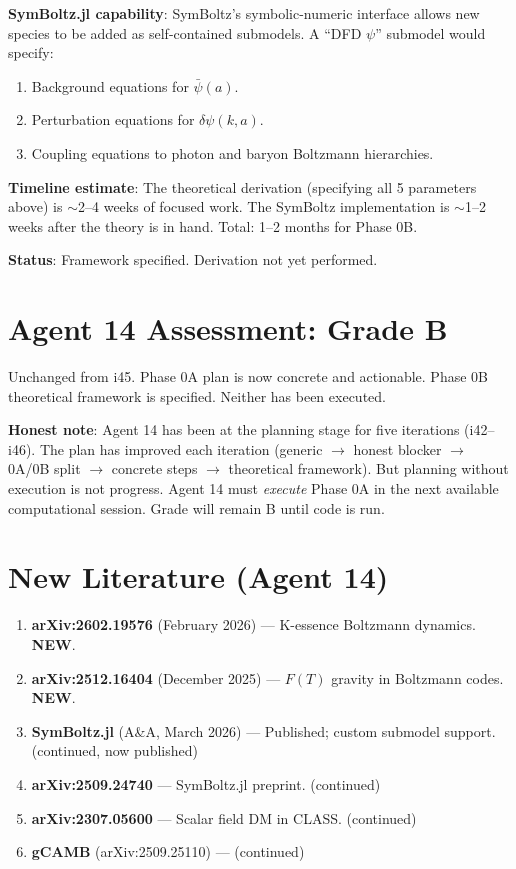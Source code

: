 \documentclass[11pt,a4paper]{article}
\newcommand{\NEW}{\textcolor{dfdblue}{\textbf{NEW}}}
\begin{document}
\begin{tcolorbox}[colback=yellow!5!white, colframe=yellow!60!black,
  title={Phase 0B: $\psi$ Perturbation Theory --- Theoretical Framework (NEW)}]
\textbf{SymBoltz.jl capability}: SymBoltz's symbolic-numeric interface allows new species to be added as self-contained submodels. A ``DFD $\psi$'' submodel would specify:
\begin{enumerate}
\item Background equations for $\bar{\psi}(a)$.
\item Perturbation equations for $\delta\psi(k, a)$.
\item Coupling equations to photon and baryon Boltzmann hierarchies.
\end{enumerate}

\textbf{Timeline estimate}: The theoretical derivation (specifying all 5 parameters above) is $\sim$2--4 weeks of focused work. The SymBoltz implementation is $\sim$1--2 weeks after the theory is in hand. Total: 1--2 months for Phase 0B.

\textbf{Status}: Framework specified. Derivation not yet performed.
\end{tcolorbox}

\section{Agent 14 Assessment: Grade B}

Unchanged from i45. Phase 0A plan is now concrete and actionable. Phase 0B theoretical framework is specified. Neither has been executed.

\textbf{Honest note}: Agent 14 has been at the planning stage for five iterations (i42--i46). The plan has improved each iteration (generic $\to$ honest blocker $\to$ 0A/0B split $\to$ concrete steps $\to$ theoretical framework). But planning without execution is not progress. Agent 14 must \emph{execute} Phase 0A in the next available computational session. Grade will remain B until code is run.

\section{New Literature (Agent 14)}

\begin{enumerate}
\item \textbf{arXiv:2602.19576} (February 2026) --- K-essence Boltzmann dynamics. \NEW.
\item \textbf{arXiv:2512.16404} (December 2025) --- $F(T)$ gravity in Boltzmann codes. \NEW.
\item \textbf{SymBoltz.jl} (A\&A, March 2026) --- Published; custom submodel support. (continued, now published)
\item \textbf{arXiv:2509.24740} --- SymBoltz.jl preprint. (continued)
\item \textbf{arXiv:2307.05600} --- Scalar field DM in CLASS. (continued)
\item \textbf{gCAMB} (arXiv:2509.25110) --- (continued)
\end{enumerate}
\end{document}
